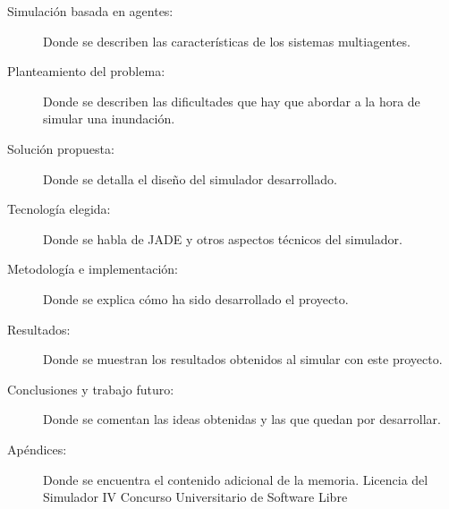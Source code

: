 \begin{description}
 \item[Simulación basada en agentes:] Donde se describen las características de
los sistemas multiagentes.
 \item[Planteamiento del problema:] Donde se describen las dificultades que hay
que abordar a la hora de simular una inundación.
 \item[Solución propuesta:] Donde se detalla el diseño del simulador
desarrollado.
 \item[Tecnología elegida:] Donde se habla de JADE y otros aspectos
técnicos del simulador.
 \item[Metodología e implementación:] Donde se explica cómo ha sido desarrollado
el proyecto.
 \item[Resultados:] Donde se muestran los resultados obtenidos al simular con
este proyecto.
 \item[Conclusiones y trabajo futuro:] Donde se comentan las ideas obtenidas y
las que quedan por desarrollar.
 \item[Apéndices:] Donde se encuentra el contenido adicional de la memoria.
  \subitem Licencia del Simulador
  \subitem IV Concurso Universitario de Software Libre
\end{description}

